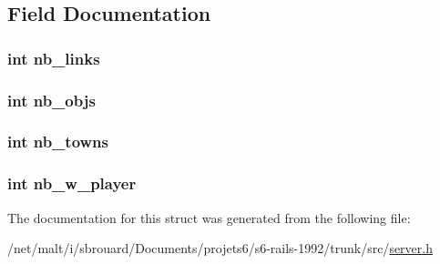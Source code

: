 \subsection{Field Documentation}
\hypertarget{structMap__info_a7c2cf198292c68f636c7c9be53dfbe82}{
\subsubsection[{nb\-\_\-links}]{\setlength{\rightskip}{0pt plus 5cm}int nb\-\_\-links}}\label{structMap__info_a7c2cf198292c68f636c7c9be53dfbe82}
\hypertarget{structMap__info_af5511048dfe5f40291ef406c0c00bb1f}{
\subsubsection[{nb\-\_\-objs}]{\setlength{\rightskip}{0pt plus 5cm}int nb\-\_\-objs}}\label{structMap__info_af5511048dfe5f40291ef406c0c00bb1f}
\hypertarget{structMap__info_ae5e7951963b1f7f7c7b80f42c7a6b04c}{
\subsubsection[{nb\-\_\-towns}]{\setlength{\rightskip}{0pt plus 5cm}int nb\-\_\-towns}}\label{structMap__info_ae5e7951963b1f7f7c7b80f42c7a6b04c}
\hypertarget{structMap__info_a5fb8f492f437e97001f4f86eb758998b}{
\subsubsection[{nb\-\_\-w\-\_\-player}]{\setlength{\rightskip}{0pt plus 5cm}int nb\-\_\-w\-\_\-player}}\label{structMap__info_a5fb8f492f437e97001f4f86eb758998b}


The documentation for this struct was generated from the following file\-:\begin{DoxyCompactItemize}
\item 
/net/malt/i/sbrouard/\-Documents/projets6/s6-\/rails-\/1992/trunk/src/\hyperlink{server_8h}{server.\-h}\end{DoxyCompactItemize}
